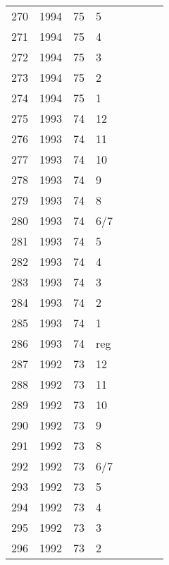 \begin{longtable}{ |l|l|l|l|l|l|l|l| }
270 & 1994 & 75 &     5 &         &                &   & \\
271 & 1994 & 75 &     4 &         &                &  & \\
272 & 1994 & 75 &     3 &         &                &  & \\
273 & 1994 & 75 &     2 &         &                &  & \\
274 & 1994 & 75 &     1 &         &                &  & \\
275 & 1993 & 74 &    12 &         &                &  & \\
276 & 1993 & 74 &    11 &         &                &  & \\
277 & 1993 & 74 &    10 &         &                &  & \\
278 & 1993 & 74 &     9 &         &                &  & \\
279 & 1993 & 74 &     8 &         &                &  & \\
280 & 1993 & 74 &   6/7 &         &                &  & \\
281 & 1993 & 74 &     5 &         &                &  & \\
282 & 1993 & 74 &     4 &         &                &  & \\
283 & 1993 & 74 &     3 &         &                &  & \\
284 & 1993 & 74 &     2 &         &                &  & \\
285 & 1993 & 74 &     1 &         &                &  & \\
286 & 1993 & 74 &   reg &         &                &  & \\
287 & 1992 & 73 &    12 &         &                &  & \\
288 & 1992 & 73 &    11 &         &                &  & \\
289 & 1992 & 73 &    10 &         &                &  & \\
290 & 1992 & 73 &     9 &         &                &  & \\
291 & 1992 & 73 &     8 &         &                &  & \\
292 & 1992 & 73 &   6/7 &         &                &  & \\
293 & 1992 & 73 &     5 &         &                &  & \\
294 & 1992 & 73 &     4 &         &                &  & \\
295 & 1992 & 73 &     3 &         &                &  & \\
296 & 1992 & 73 &     2 &         &                &  & \\

\end{longtable}
